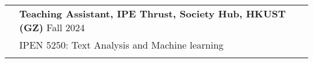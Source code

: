 \documentclass[letterpaper, 11pt]{article}
\begin{document}
\begin{longtable}{p{1.3in}p{4.8in}}

{\color{RoyalBlue}{Teaching Experience}} 
& \textbf{Teaching Assistant, IPE Thrust, Society Hub, HKUST (GZ)} \hfill Fall 2024 \\
& IPEN 5250: Text Analysis and Machine learning \\
& \\




 


\end{longtable}
\end{document}
